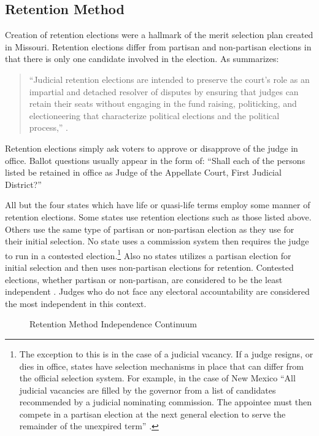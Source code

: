 \documentclass[12pt]{article}
\begin{document}
\subsection*{Retention Method}
Creation of retention elections were a hallmark of the merit selection plan created in Missouri. Retention elections differ from partisan and non-partisan elections in that there is only one candidate involved in the election. As \citeauthor{Reid1999} summarizes: \begin{quote}``Judicial retention elections are intended to preserve the court’s role as an impartial and detached resolver of disputes by ensuring that judges can retain their seats without engaging in the fund raising, politicking, and electioneering that characterize political elections and the political process,'' \citep[68]{Reid1999}.\end{quote}  Retention elections simply ask voters to approve or disapprove of the judge in office. Ballot questions usually appear in the form of: ``Shall each of the persons listed be retained in office as Judge of the Appellate Court, First Judicial District?''

All but the four states which have life or quasi-life terms employ some manner of retention elections. Some states use retention elections such as those listed above. Others use the same type of partisan or non-partisan election as they use for their initial selection. No state uses a commission system then requires the judge to run in a contested election.\footnote{The exception to this is in the case of a judicial vacancy.  If a judge resigns, or dies in office, states have selection mechanisms in place that can differ from the official selection system.  For example, in the case of New Mexico ``All judicial vacancies are filled by the governor from a list of candidates recommended by a judicial nominating commission. The appointee must then compete in a partisan election at the next general election to serve the remainder of the unexpired term'' \citep{AJS}.}  Also no states utilizes a partisan election for initial selection and then uses non-partisan elections for retention.  Contested elections, whether partisan or non-partisan, are considered to be the least independent \citep{Choi2010,ABA2003,Canes-Wrone2012}. Judges who do not face any electoral accountability are considered the most independent in this context.

\begin{figure}[tbh]\centering\caption{Retention Method Independence Continuum}\label{retentioncontinuum}
\end{figure}
\end{document}
